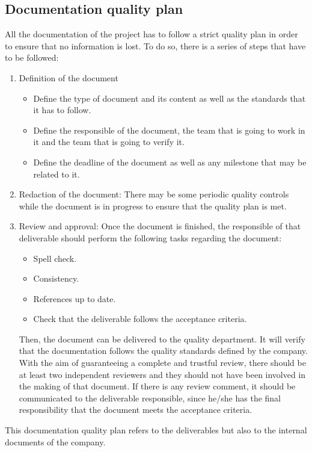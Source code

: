 \subsection{Documentation quality plan}
All the documentation of the project has to follow a strict quality plan in order to ensure that no information is lost. To do so, there is a series of steps that have to be followed:
\begin{enumerate}
	\item Definition of the document
	\begin{itemize}
		\item Define the type of document and its content as well as the standards that it has to follow.
		\item Define the responsible of the document, the team that is going to work in it and the team that is going to verify it.
		\item Define the deadline of the document as well as any milestone that may be related to it.
	\end{itemize}
	\item Redaction of the document: There may be some periodic quality controls while the document is in progress to ensure that the quality plan is met.
	\item Review and approval: Once the document is finished, the responsible of that deliverable should perform the following tasks regarding the document:
	\begin{itemize}
		\item Spell check.
		\item Consistency.
		\item References up to date.
		\item Check that the deliverable follows the acceptance criteria.
	\end{itemize}
	Then, the document can be delivered to the quality department. It will verify that the documentation follows the quality standards defined by the company. With the aim of guaranteeing a complete and trustful review, there should be at least two independent reviewers and they should not have been involved in the making of that document.
	If there is any review comment, it should be communicated to the deliverable responsible, since he/she has the final responsibility that the document meets the acceptance criteria.
\end{enumerate}
This documentation quality plan refers to the deliverables but also to the internal documents of the company.

